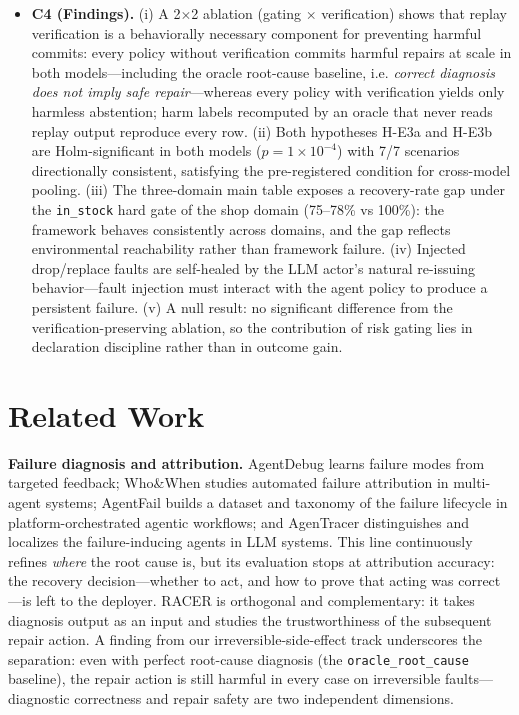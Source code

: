 \documentclass[10pt]{article}
\begin{document}
\begin{itemize}
  \item \textbf{C4 (Findings).} (i) A 2$\times$2 ablation (gating $\times$ verification) shows that replay verification is a behaviorally necessary component for preventing harmful commits: every policy without verification commits harmful repairs at scale in both models---including the oracle root-cause baseline, i.e. \emph{correct diagnosis does not imply safe repair}---whereas every policy with verification yields only harmless abstention; harm labels recomputed by an oracle that never reads replay output reproduce every row. (ii) Both hypotheses H-E3a and H-E3b are Holm-significant in both models ($p = 1\times10^{-4}$) with 7/7 scenarios directionally consistent, satisfying the pre-registered condition for cross-model pooling. (iii) The three-domain main table exposes a recovery-rate gap under the \texttt{in\_stock} hard gate of the shop domain (75--78\% vs 100\%): the framework behaves consistently across domains, and the gap reflects environmental reachability rather than framework failure. (iv) Injected drop/replace faults are self-healed by the LLM actor's natural re-issuing behavior---fault injection must interact with the agent policy to produce a persistent failure. (v) A null result: no significant difference from the verification-preserving ablation, so the contribution of risk gating lies in declaration discipline rather than in outcome gain.

\end{itemize}

\section{Related Work}

\textbf{Failure diagnosis and attribution.} AgentDebug \cite{ref1} learns failure modes from targeted feedback; Who\&When \cite{ref2} studies automated failure attribution in multi-agent systems; AgentFail \cite{ref3} builds a dataset and taxonomy of the failure lifecycle in platform-orchestrated agentic workflows; and AgenTracer \cite{ref4} distinguishes and localizes the failure-inducing agents in LLM systems. This line continuously refines \emph{where} the root cause is, but its evaluation stops at attribution accuracy: the recovery decision---whether to act, and how to prove that acting was correct---is left to the deployer. RACER is orthogonal and complementary: it takes diagnosis output as an input and studies the trustworthiness of the subsequent repair action. A finding from our irreversible-side-effect track underscores the separation: even with perfect root-cause diagnosis (the \texttt{oracle\_root\_cause} baseline), the repair action is still harmful in every case on irreversible faults---diagnostic correctness and repair safety are two independent dimensions.
\end{document}
